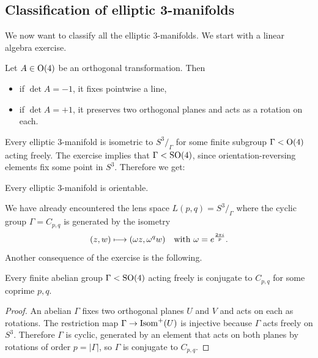 \subsection{Classification of elliptic 3-manifolds}
We now want to classify all the elliptic 3-manifolds. We start with a linear algebra exercise.
\begin{ex}
Let $A \in {\rm O}(4)$ be an orthogonal transformation. Then
\begin{itemize}
\item if $\det A = -1$, it fixes pointwise a line,
\item if $\det A = +1$, it preserves two orthogonal planes and acts as a rotation on each.
\end{itemize}
\end{ex}

Every elliptic 3-manifold is isometric to $S^3/_\Gamma$ for some finite subgroup $\Gamma < {\rm O}(4)$ acting freely. The exercise implies that $\Gamma < {\rm SO}(4)$, since orientation-reversing elements fix some point in $S^3$. Therefore we get:

\begin{cor}
Every elliptic 3-manifold is orientable.
\end{cor}

We have already encountered the lens space $L(p,q) = S^3/_\Gamma$ where the cyclic group $\Gamma = C_{p,q}$ is generated by the isometry 
$$(z,w) \longmapsto (\omega z, \omega^q w)\quad {\rm with}\  \omega = e^\frac{2\pi i}p.$$ 
Another consequence of the exercise is the following. 
\begin{cor} \label{abelian:SO4:cor}
Every finite abelian group $\Gamma < {\rm SO}(4)$ acting freely is conjugate to $C_{p,q}$ for some coprime $p,q$.
\end{cor}
\begin{proof}
An abelian $\Gamma$ fixes two orthogonal planes $U$ and $V$ and acts on each as rotations. The restriction map $\Gamma \to {\rm Isom}^+(U)$ is injective because $\Gamma$ acts freely on $S^3$. Therefore $\Gamma$ is cyclic, generated by an element that acts on both planes by rotations of order $p=|\Gamma|$, so $\Gamma$ is conjugate to $C_{p,q}$.
\end{proof}

